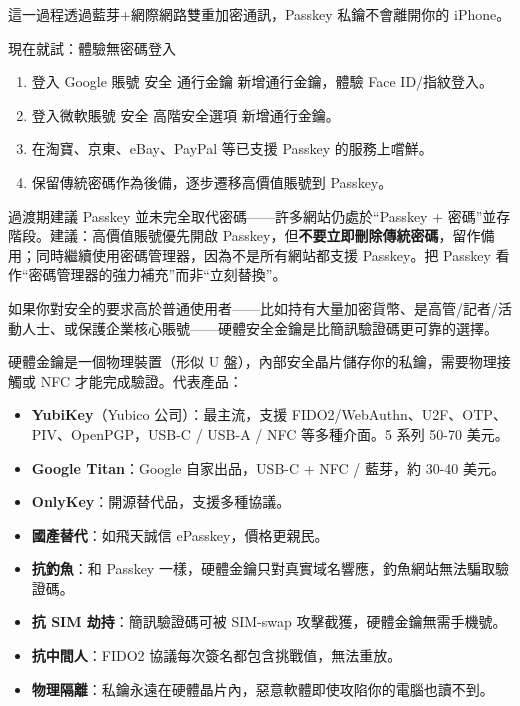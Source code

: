 這一過程透過藍芽+網際網路雙重加密通訊，Passkey 私鑰不會離開你的 iPhone。

\begin{tcbpractice}{現在就試：體驗無密碼登入}
\begin{enumerate}
  \item 登入 Google 賬號 安全 通行金鑰 新增通行金鑰，體驗 Face ID/指紋登入。
  \item 登入微軟賬號 安全 高階安全選項 新增通行金鑰。
  \item 在淘寶、京東、eBay、PayPal 等已支援 Passkey 的服務上嚐鮮。
  \item 保留傳統密碼作為後備，逐步遷移高價值賬號到 Passkey。
\end{enumerate}

\end{tcbpractice}

\begin{tcbwarn}{過渡期建議}
Passkey 並未完全取代密碼——許多網站仍處於“Passkey + 密碼”並存階段。建議：高價值賬號優先開啟 Passkey，但\textbf{不要立即刪除傳統密碼}，留作備用；同時繼續使用密碼管理器，因為不是所有網站都支援 Passkey。把 Passkey 看作“密碼管理器的強力補充”而非“立刻替換”。

\end{tcbwarn}


如果你對安全的要求高於普通使用者——比如持有大量加密貨幣、是高管/記者/活動人士、或保護企業核心賬號——硬體安全金鑰是比簡訊驗證碼更可靠的選擇。


硬體金鑰是一個物理裝置（形似 U 盤），內部安全晶片儲存你的私鑰，需要物理接觸或 NFC 才能完成驗證。代表產品：

\begin{itemize}
  \item \textbf{YubiKey}（Yubico 公司）：最主流，支援 FIDO2/WebAuthn、U2F、OTP、PIV、OpenPGP，USB-C / USB-A / NFC 等多種介面。5 系列 50-70 美元。
  \item \textbf{Google Titan}：Google 自家出品，USB-C + NFC / 藍芽，約 30-40 美元。
  \item \textbf{OnlyKey}：開源替代品，支援多種協議。
  \item \textbf{國產替代}：如飛天誠信 ePasskey，價格更親民。
\end{itemize}


\begin{itemize}
  \item \textbf{抗釣魚}：和 Passkey 一樣，硬體金鑰只對真實域名響應，釣魚網站無法騙取驗證碼。
  \item \textbf{抗 SIM 劫持}：簡訊驗證碼可被 SIM-swap 攻擊截獲，硬體金鑰無需手機號。
  \item \textbf{抗中間人}：FIDO2 協議每次簽名都包含挑戰值，無法重放。
  \item \textbf{物理隔離}：私鑰永遠在硬體晶片內，惡意軟體即使攻陷你的電腦也讀不到。
\end{itemize}

